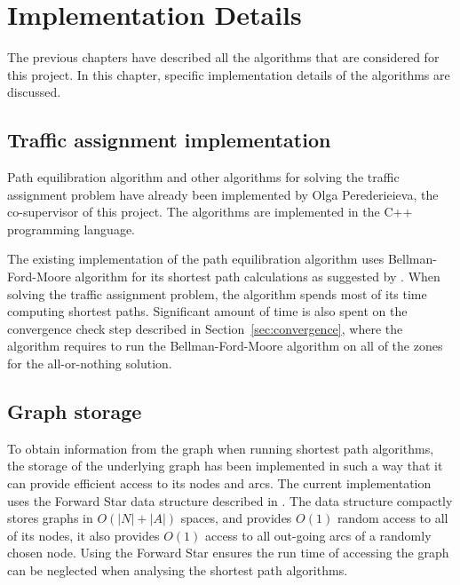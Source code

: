 \chapter{Implementation Details} \label{chap:implementation}
The previous chapters have described all the algorithms that are considered for this project.
In this chapter, specific implementation details of the algorithms are discussed.

\section{Traffic assignment implementation}
Path equilibration algorithm and other algorithms for solving the traffic assignment problem have already been implemented by Olga Perederieieva, the co-supervisor of this project.
The algorithms are implemented in the C++ programming language.

The existing implementation of the path equilibration algorithm uses Bellman-Ford-Moore algorithm for its shortest path calculations as suggested by \citet{Sheffi}.
When solving the traffic assignment problem,
the algorithm spends most of its time computing shortest paths.
Significant amount of time is also spent on the convergence check step described in Section~\ref{sec:convergence},
where the algorithm requires to run the Bellman-Ford-Moore algorithm on all of the zones for the all-or-nothing solution.

\section{Graph storage}
To obtain information from the graph when running shortest path algorithms,
the storage of the underlying graph has been implemented in such a way that it can provide efficient access to its nodes and arcs.
The current implementation uses the Forward Star data structure described in \citet{Sheffi}.
The data structure compactly stores graphs in $O(|N|+|A|)$ spaces,
and provides $O(1)$ random access to all of its nodes,
it also provides $O(1)$ access to all out-going arcs of a randomly chosen node.
Using the Forward Star ensures the run time of accessing the graph can be neglected when analysing the shortest path algorithms.

